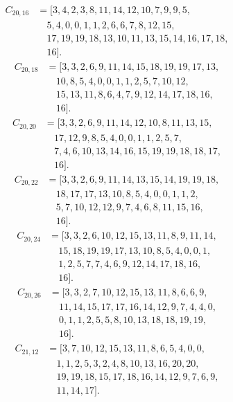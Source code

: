 \documentclass[11pt,a4paper]{article}
\theoremstyle{definition}\newtheorem{definition}[theorem]{Definition}
\theoremstyle{remark}\newtheorem{remark}[theorem]{Remark}
\begin{document}
\[\begin{aligned}
C_{20,16}&=[3,4,2,3,8,11,14,12,10,7,9,9,5,\\
&\quad 5,4,0,0,1,1,2,6,6,7,8,12,15,\\
&\quad 17,19,19,18,13,10,11,13,15,14,16,17,18,\\
&\quad 16].
\end{aligned}\]
\[\begin{aligned}
C_{20,18}&=[3,3,2,6,9,11,14,15,18,19,19,17,13,\\
&\quad 10,8,5,4,0,0,1,1,2,5,7,10,12,\\
&\quad 15,13,11,8,6,4,7,9,12,14,17,18,16,\\
&\quad 16].
\end{aligned}\]
\[\begin{aligned}
C_{20,20}&=[3,3,2,6,9,11,14,12,10,8,11,13,15,\\
&\quad 17,12,9,8,5,4,0,0,1,1,2,5,7,\\
&\quad 7,4,6,10,13,14,16,15,19,19,18,18,17,\\
&\quad 16].
\end{aligned}\]
\[\begin{aligned}
C_{20,22}&=[3,3,2,6,9,11,14,13,15,14,19,19,18,\\
&\quad 18,17,17,13,10,8,5,4,0,0,1,1,2,\\
&\quad 5,7,10,12,12,9,7,4,6,8,11,15,16,\\
&\quad 16].
\end{aligned}\]
\[\begin{aligned}
C_{20,24}&=[3,3,2,6,10,12,15,13,11,8,9,11,14,\\
&\quad 15,18,19,19,17,13,10,8,5,4,0,0,1,\\
&\quad 1,2,5,7,7,4,6,9,12,14,17,18,16,\\
&\quad 16].
\end{aligned}\]
\[\begin{aligned}
C_{20,26}&=[3,3,2,7,10,12,15,13,11,8,6,6,9,\\
&\quad 11,14,15,17,17,16,14,12,9,7,4,4,0,\\
&\quad 0,1,1,2,5,5,8,10,13,18,18,19,19,\\
&\quad 16].
\end{aligned}\]
\[\begin{aligned}
C_{21,12}&=[3,7,10,12,15,13,11,8,6,5,4,0,0,\\
&\quad 1,1,2,5,3,2,4,8,10,13,16,20,20,\\
&\quad 19,19,18,15,17,18,16,14,12,9,7,6,9,\\
&\quad 11,14,17].
\end{aligned}\]
\end{document}
